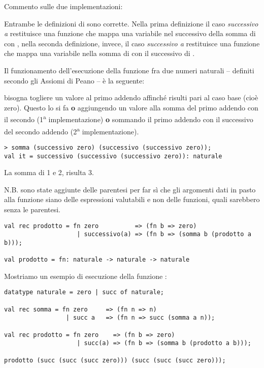 Commento sulle due implementazioni:

\medskip
Entrambe le definizioni di  sono corrette. Nella prima definizione il caso \emph{successivo a} restituisce una funzione che mappa una variabile  nel successivo della somma di  con , nella seconda definizione, invece, il caso \emph{successivo a} restituisce una funzione che mappa una variabile  nella somma di  con il successivo di .

\medskip
Il funzionamento dell'esecuzione della funzione  fra due numeri naturali -- definiti secondo gli Assiomi di Peano -- è la seguente:

\smallskip
bisogna togliere un valore  al primo addendo affinché risulti pari al caso base (cioè zero). Questo lo si fa \textbf{o} aggiungendo un valore  alla somma del primo addendo con il secondo (1\textsuperscript{a} implementazione) \textbf{o} sommando il primo addendo con il successivo del secondo addendo (2\textsuperscript{a} implementazione).

\begin{lstlisting}[style = SML, caption = {Esempio di esecuzione}]
> somma (successivo zero) (successivo (successivo zero));
val it = successivo (successivo (successivo zero)): naturale
\end{lstlisting}

La somma di 1 e 2, risulta 3.

\medskip
N.B. sono state aggiunte delle parentesi per far sì che gli argomenti dati in pasto alla funzione  siano delle espressioni valutabili e non delle funzioni, quali sarebbero senza le parentesi.

\begin{lstlisting}[style = SML, caption={Definizione della funzione \sml{prodotto} tramite gli Assiomi di Peano}]
val rec prodotto = fn zero			=> (fn b => zero)
					| successivo(a) => (fn b => (somma b (prodotto a b)));

val prodotto = fn: naturale -> naturale -> naturale
\end{lstlisting}

Mostriamo un esempio di esecuzione della funzione :

\begin{lstlisting}[style = SML, caption={Esempio di esecuzione}]
datatype naturale = zero | succ of naturale;

val rec somma = fn zero		=> (fn n => n)
				 | succ a	=> (fn n => succ (somma a n));

val rec prodotto = fn zero	  => (fn b => zero)
					| succ(a) => (fn b => (somma b (prodotto a b)));

prodotto (succ (succ (succ zero))) (succ (succ (succ zero)));
\end{lstlisting}
